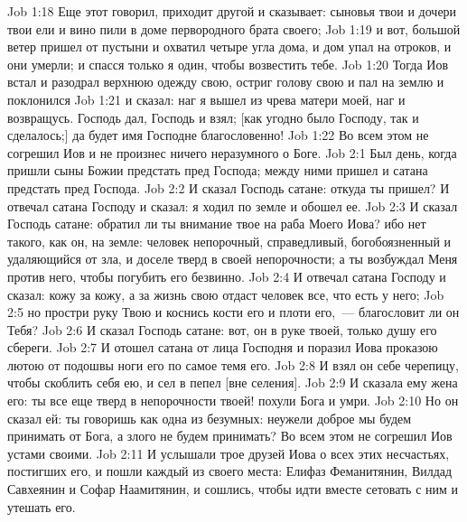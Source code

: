 \vs Job 1:18 Еще этот говорил, приходит другой и сказывает: сыновья твои и дочери твои ели и вино пили в доме первородного брата своего;
\vs Job 1:19 и вот, большой ветер пришел от пустыни и охватил четыре угла дома, и дом упал на отроков, и они умерли; и спасся только я один, чтобы возвестить тебе.
\rsbpar\vs Job 1:20 Тогда Иов встал и разодрал верхнюю одежду свою, остриг голову свою и пал на землю и поклонился
\vs Job 1:21 и сказал: наг я вышел из чрева матери моей, наг и возвращусь. Господь дал, Господь и взял; [как угодно было Господу, так и сделалось;] да будет имя Господне благословенно!
\vs Job 1:22 Во всем этом не согрешил Иов и не произнес ничего неразумного о Боге.
\vs Job 2:1 Был день, когда пришли сыны Божии предстать пред Господа; между ними пришел и сатана предстать пред Господа.
\vs Job 2:2 И сказал Господь сатане: откуда ты пришел? И отвечал сатана Господу и сказал: я ходил по земле и обошел ее.
\vs Job 2:3 И сказал Господь сатане: обратил ли ты внимание твое на раба Моего Иова? ибо нет такого, как он, на земле: человек непорочный, справедливый, богобоязненный и удаляющийся от зла, и доселе тверд в своей непорочности; а ты возбуждал Меня против него, чтобы погубить его безвинно.
\vs Job 2:4 И отвечал сатана Господу и сказал: кожу за кожу, а за жизнь свою отдаст человек все, что есть у него;
\vs Job 2:5 но простри руку Твою и коснись кости его и плоти его,~--- благословит ли он Тебя?
\vs Job 2:6 И сказал Господь сатане: вот, он в руке твоей, только душу его сбереги.
\rsbpar\vs Job 2:7 И отошел сатана от лица Господня и поразил Иова проказою лютою от подошвы ноги его по самое темя его.
\vs Job 2:8 И взял он себе черепицу, чтобы скоблить себя ею, и сел в пепел [вне селения].
\vs Job 2:9 И сказала ему жена его: ты все еще тверд в непорочности твоей! похули Бога и умри.
\vs Job 2:10 Но он сказал ей: ты говоришь как одна из безумных: неужели доброе мы будем принимать от Бога, а злого не будем принимать? Во всем этом не согрешил Иов устами своими.
\vs Job 2:11 И услышали трое друзей Иова о всех этих несчастьях, постигших его, и пошли каждый из своего места: Елифаз Феманитянин, Вилдад Савхеянин и Софар Наамитянин, и сошлись, чтобы идти вместе сетовать с ним и утешать его.
